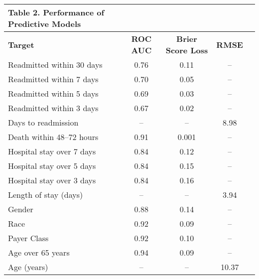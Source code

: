 \begin{adjustbox}{width={\textwidth},keepaspectratio}%
{
\begin{tabular}{lcccc}
\rowcolor{NEJMTopRow} \multicolumn{4}{l}%
{{\textbf{\color{NEJMRed} Table 2.}}
\textbf{Performance of Predictive Models}} 
\\ %
\hline
\textbf{Target} & \textbf{ROC AUC} & \textbf{Brier Score Loss} &   \textbf{RMSE} \\
Readmitted within 30 days &    0.76 &              0.11 &        -- \\
Readmitted within 7 days  &    0.70 &              0.05 &        -- \\
Readmitted within 5 days  &    0.69 &              0.03 &        -- \\
Readmitted within 3 days  &    0.67 &              0.02 &        -- \\
Days to readmission       &      -- &                -- &      8.98 \\
Death within 48--72 hours &    0.91 &              0.001 &        -- \\
Hospital stay over 7 days &    0.84 &              0.12 &        -- \\
Hospital stay over 5 days &    0.84 &              0.15 &        -- \\
Hospital stay over 3 days &    0.84 &              0.16 &        -- \\
Length of stay (days)     &      -- &                -- &      3.94 \\
Gender                    &    0.88 &              0.14 &        -- \\
Race                      &    0.92 &              0.09 &        -- \\
Payer Class               &    0.92 &              0.10 &        -- \\
Age over 65 years         &    0.94 &              0.09 &        -- \\
Age (years)               &      -- &                -- &     10.37 \\
\end{tabular}
\label{table:table2}
}
\end{adjustbox}



